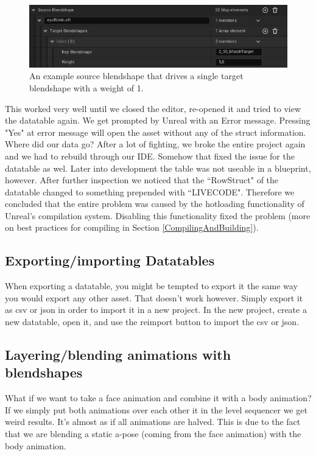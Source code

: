 \documentclass{uva-inf-article}
\begin{document}
\begin{figure}[hbt!]
    \centering
    \includegraphics[width=\textwidth]{imgs/singleBlendshapeData.png}
    \caption{An example source blendshape that drives a single target blendshape with a weight of 1.}
    \label{fig:blendshapeStructExample}
\end{figure}

This worked very well until we closed the editor, re-opened it and tried to view the datatable again. We get prompted by Unreal with an Error message. Pressing "Yes" at error message will open the asset without any of the struct information. Where did our data go? After a lot of fighting, we broke the entire project again and we had to rebuild through our IDE. Somehow that fixed the issue for the datatable as wel. Later into development the table was not useable in a blueprint, however. After further inspection we noticed that the ``RowStruct" of the datatable changed to something prepended with ``LIVECODE". Therefore we concluded that the entire problem was caused by the hotloading functionality of Unreal's compilation system. Disabling this functionality fixed the problem (more on best practices for compiling in Section \ref{CompilingAndBuilding}).

\subsection{Exporting/importing Datatables}
When exporting a datatable, you might be tempted to export it the same way you would export any other asset. That doesn't work however. Simply export it as csv or json in order to import it in a new project. In the new project, create a new datatable, open it, and use the reimport button to import the csv or json.

\subsection{Layering/blending animations with blendshapes}
What if we want to take a face animation and combine it with a body animation? If we simply put both animations over each other it in the level sequencer we get weird results. It's almost as if all animations are halved. This is due to the fact that we are blending a static a-pose (coming from the face animation) with the body animation.
\end{document}
